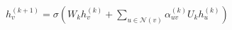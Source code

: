 $h_v^{(k+1)}=\sigma\left(W_k h_v^{(k)}+\sum_{u\in\mathcal{N}(v)}\alpha_{uv}^{(k)}U_k h_u^{(k)}\right)$
